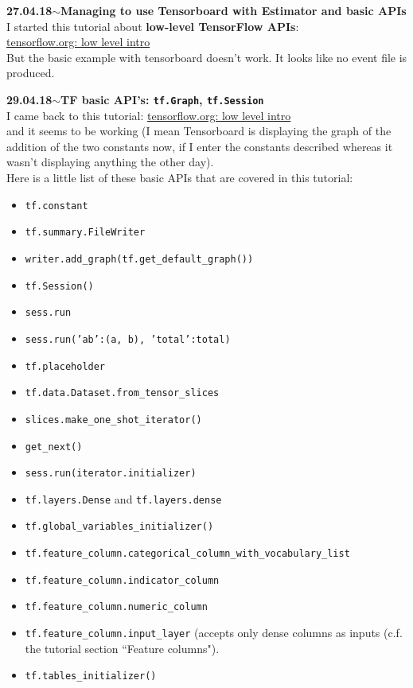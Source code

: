 \documentclass[11pt,a4paper]{article}
\newenvironment{loggentry}[2]%
{\noindent\textbf{#1}\hspace{1cm}$\mathbf{\sim}$\text{ }\textbf{#2}\\}{\vspace{0.5cm}}
\begin{document}
\begin{loggentry}{27.04.18}{Managing to use Tensorboard with Estimator and basic APIs}
I started this tutorial about \textbf{low-level TensorFlow APIs}:\\
\href{https://www.tensorflow.org/programmers_guide/low_level_intro}{tensorflow.org: low level intro}\\
But the basic example with tensorboard doesn't work. It looks like no event file is produced.
\end{loggentry}

\begin{loggentry}{29.04.18}{TF basic API's: \texttt{tf.Graph}, \texttt{tf.Session}}
I came back to this tutorial:
\href{https://www.tensorflow.org/programmers_guide/low_level_intro}{tensorflow.org: low level intro}\\
and it seems to be working (I mean Tensorboard is displaying the graph of the addition of the two constants now, if I enter the constants described whereas it wasn't displaying anything the other day).\\
Here is a little list of these basic APIs that are covered in this tutorial:\\
\begin{itemize}
\item \texttt{tf.constant}
\item \texttt{tf.summary.FileWriter}
\item \texttt{writer.add\_graph(tf.get\_default\_graph())}
\item \texttt{tf.Session()}
\item \texttt{sess.run}
\item \texttt{sess.run({'ab':(a, b), 'total':total})}
\item \texttt{tf.placeholder}
\item \texttt{tf.data.Dataset.from\_tensor\_slices}
\item \texttt{slices.make\_one\_shot\_iterator()}
\item \texttt{get\_next()}
\item \texttt{sess.run(iterator.initializer)}
\item \texttt{tf.layers.Dense} and \texttt{tf.layers.dense}
\item \texttt{tf.global\_variables\_initializer()}
\item \texttt{tf.feature\_column.categorical\_column\_with\_vocabulary\_list}
\item \texttt{tf.feature\_column.indicator\_column}
\item \texttt{tf.feature\_column.numeric\_column}
\item \texttt{tf.feature\_column.input\_layer} (accepts only dense columns as inputs (c.f. the tutorial section ``Feature columns").
\item \texttt{tf.tables\_initializer()
}
\end{itemize}

\end{loggentry}
\end{document}
